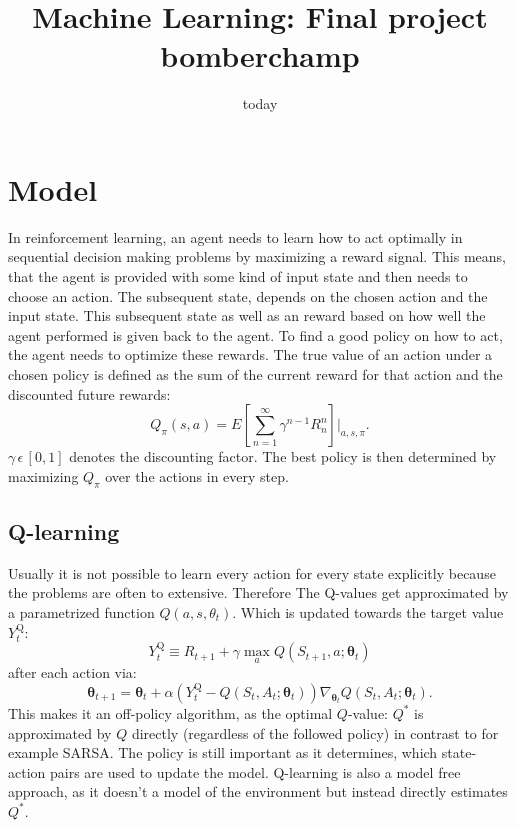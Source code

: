 \documentclass[12pt]{article}
\title{Machine Learning: Final project bomberchamp}
\date{today}
\begin{document}
\section{Model}
In reinforcement learning, an agent needs to learn how to act optimally in sequential decision making problems by maximizing a reward signal. This means, that the agent is provided with some kind of input state and then needs to choose an action. The subsequent state, depends on the chosen action and the input state. This subsequent state as well as an reward based on how well the agent performed is given back to the agent. To find a good policy on how to act, the agent needs to optimize these rewards.
The true value of an action under a chosen policy is defined as the sum of the current reward for that action and the discounted future rewards:
\begin{equation}
Q_\pi(s,a)= E\left[\sum_{n=1}^{\infty} \gamma^{n-1}R_n^n\right] \Bigg|_{a,s,\pi}.
\end{equation} 
$\gamma\,\epsilon\,[0,1]$ denotes the discounting factor.
The best policy is then determined by maximizing $Q_\pi$ over the actions in every step.
\subsection{Q-learning}
Usually it is not possible to learn every action for every state explicitly because the problems are often to extensive. Therefore The Q-values get approximated by a parametrized function $Q(a,s,\theta_t)$. Which is updated towards the target value $Y_{t}^{\mathrm{Q}}$:
\begin{equation}
Y_{t}^{\mathrm{Q}} \equiv R_{t+1}+\gamma \max _{a} Q\left(S_{t+1}, a ; \boldsymbol{\theta}_{t}\right)
\end{equation}
after each action via:
\begin{equation}
\boldsymbol{\theta}_{t+1}=\boldsymbol{\theta}_{t}+\alpha\left(Y_{t}^{\mathrm{Q}}-Q\left(S_{t}, A_{t} ; \boldsymbol{\theta}_{t}\right)\right) \nabla_{\boldsymbol{\theta}_{t}} Q\left(S_{t}, A_{t} ; \boldsymbol{\theta}_{t}\right).
\end{equation}
\cite{DBLP:journals/corr/HasseltGS15}
This makes it an off-policy algorithm, as the optimal $Q$-value: $Q^*$ is approximated by $Q$ directly (regardless of the followed policy) in contrast to for example SARSA. The policy is still important as it determines, which state-action pairs are used to update the model\cite{Sutton:1998:IRL:551283}. 
Q-learning is also a model free approach, as it doesn't a model of the environment but instead directly estimates $Q^*$.
\end{document}
